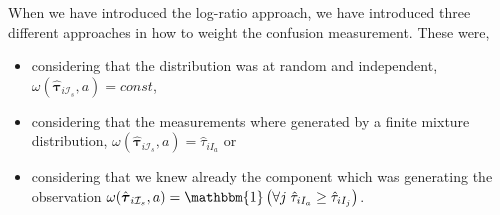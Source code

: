 \documentclass[10pt, a4paper]{article}
\newcommand{\m}[1]{\boldsymbol{#1}}
\begin{document}
When we have introduced the log-ratio approach, we have introduced three different approaches in how to weight the confusion measurement. These were,
\begin{itemize}
\item considering that the distribution was at random and independent, $\omega(\hat{\m \tau}_{i \mathcal{I}_s}, a) = const$,
\item considering that the measurements where generated by a finite mixture distribution, $\omega(\hat{\m \tau}_{i \mathcal{I}_s}, a) =  \hat{\tau}_{iI_a}$ or
\item considering that we knew already the component which was generating the observation $\omega(\hat{\m \tau}_{i \mathcal{I}_s}, a) = \mathbbm{1}\left( \forall j\; \hat{\tau}_{i I_{a}} \geq \hat{\tau}_{iI_j} \right)$.
\end{itemize}




\end{document}
